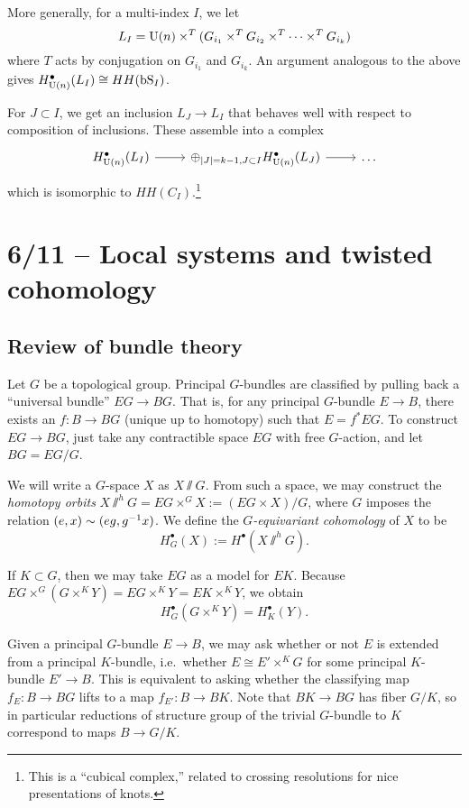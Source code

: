 More generally, for a multi-index $I$, we let
\[
	L_I = \mathrm{U}(n) \times^T (G_{i_1} \times^T G_{i_2} \times^T \dots \times^T G_{i_k})
\]
where $T$ acts by conjugation on $G_{i_1}$ and $G_{i_k}$.
An argument analogous to the above gives $H^\bullet_{\mathrm{U}(n)}(L_I) \cong HH(\mathrm{bS}_I)$.

For $J \subset I$, we get an inclusion $L_J \to L_I$ that behaves well with respect to composition of inclusions.
These assemble into a complex
\[
	\begin{tikzcd}
		H^\bullet_{\U(n)}(L_I) \rar & \oplus_{\abs{J} = k-1, J \subset I} H^\bullet_{\U(n)}(L_J) \rar & \dots 
	\end{tikzcd}
\]
which is isomorphic to $HH(C_I)$.\footnote{This is a ``cubical complex,'' related to crossing resolutions for nice presentations of knots.}

\section{6/11 -- Local systems and twisted cohomology}

\subsection{Review of bundle theory}

Let $G$ be a topological group.
Principal $G$-bundles are classified by pulling back a ``universal bundle'' $EG \to BG$.
That is, for any principal $G$-bundle $E \to B$, there exists an $f: B \to BG$ (unique up to homotopy) such that $E = f^* EG$.
To construct $EG \to BG$, just take any contractible space $EG$ with free $G$-action, and let $BG = EG / G$.

We will write a $G$-space $X$ as $X \sslash G$.
From such a space, we may construct the \emph{homotopy orbits} $X \sslash^h G = EG \times^G X := (EG \times X) / G$, where $G$ imposes the relation $(e, x) \sim (eg, g^{-1} x)$.
We define the \emph{$G$-equivariant cohomology} of $X$ to be
\[
	H^\bullet_G(X) := H^\bullet(X \sslash^h G).
\]

If $K \subset G$, then we may take $EG$ as a model for $EK$.
Because $EG \times^G (G \times^K Y) = EG \times^K Y = EK \times^K Y$, we obtain
\[
	H^\bullet_G(G \times^K Y) = H^\bullet_K(Y).
\]

Given a principal $G$-bundle $E \to B$, we may ask whether or not $E$ is extended from a principal $K$-bundle, i.e.\ whether $E \cong E' \times^K G$ for some principal $K$-bundle $E' \to B$.
This is equivalent to asking whether the classifying map $f_E: B \to BG$ lifts to a map $f_{E'}: B \to BK$.
Note that $BK \to BG$ has fiber $G/K$, so in particular reductions of structure group of the trivial $G$-bundle to $K$ correspond to maps $B \to G / K$.

